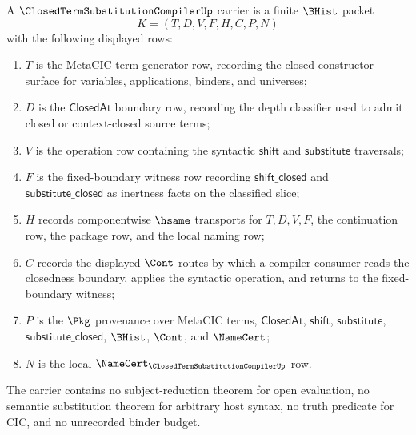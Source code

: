\begin{definition}
\label{def:closed-term-substitution-compiler}
A $\ClosedTermSubstitutionCompilerUp$ carrier is a finite $\BHist$ packet
$$
K=(T,D,V,F,H,C,P,N)
$$
with the following displayed rows:
\begin{enumerate}
\item $T$ is the MetaCIC term-generator row, recording the closed constructor surface for variables, applications, binders, and universes;
\item $D$ is the $\mathsf{ClosedAt}$ boundary row, recording the depth classifier used to admit closed or context-closed source terms;
\item $V$ is the operation row containing the syntactic $\mathsf{shift}$ and $\mathsf{substitute}$ traversals;
\item $F$ is the fixed-boundary witness row recording $\mathsf{shift\_closed}$ and $\mathsf{substitute\_closed}$ as inertness facts on the classified slice;
\item $H$ records componentwise $\hsame$ transports for $T,D,V,F$, the continuation row, the package row, and the local naming row;
\item $C$ records the displayed $\Cont$ routes by which a compiler consumer reads the closedness boundary, applies the syntactic operation, and returns to the fixed-boundary witness;
\item $P$ is the $\Pkg$ provenance over MetaCIC terms, $\mathsf{ClosedAt}$, $\mathsf{shift}$, $\mathsf{substitute}$, $\mathsf{substitute\_closed}$, $\BHist$, $\Cont$, and $\NameCert$;
\item $N$ is the local $\NameCert_{\ClosedTermSubstitutionCompilerUp}$ row.
\end{enumerate}
The carrier contains no subject-reduction theorem for open evaluation, no semantic substitution theorem for arbitrary host syntax, no truth predicate for CIC, and no unrecorded binder budget.
\end{definition}

